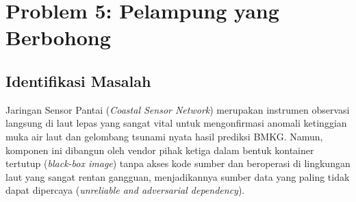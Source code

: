 \clearpage
\section{Problem 5: Pelampung yang Berbohong}
\label{sec:problem_5}

\subsection{Identifikasi Masalah}
Jaringan Sensor Pantai (\textit{Coastal Sensor Network}) merupakan instrumen observasi langsung di laut lepas yang sangat vital untuk mengonfirmasi anomali ketinggian muka air laut dan gelombang tsunami nyata hasil prediksi BMKG. Namun, komponen ini dibangun oleh vendor pihak ketiga dalam bentuk kontainer tertutup (\textit{black-box image}) tanpa akses kode sumber dan beroperasi di lingkungan laut yang sangat rentan gangguan, menjadikannya sumber data yang paling tidak dapat dipercaya (\textit{unreliable and adversarial dependency}).

\vspace{1em}

